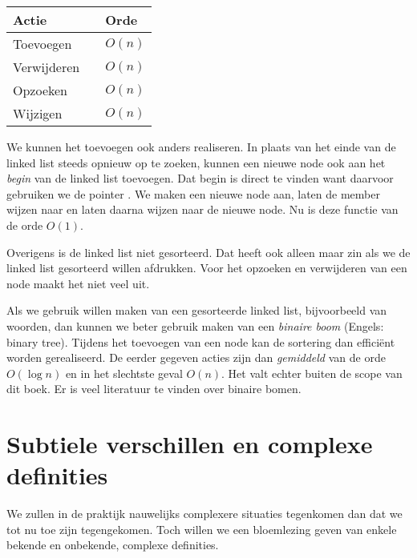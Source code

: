 \begin{table}[!ht]
\begin{tabular}{lp{1em}l}
Actie && Orde \\
\midrule
Toevoegen && $O(n)$ \\
Verwijderen && $O(n)$ \\
Opzoeken && $O(n)$ \\
Wijzigen && $O(n)$
\end{tabular}
\end{table}
\basic

We kunnen het toevoegen ook anders realiseren. In plaats van het einde van de linked list steeds opnieuw op te zoeken, kunnen een nieuwe node ook aan het \textsl{begin} van de linked list toevoegen. Dat begin is direct te vinden want daarvoor gebruiken we de pointer . We maken een nieuwe node aan, laten de member  wijzen naar  en laten daarna  wijzen naar de nieuwe node. Nu is deze functie van de orde $O(1)$.

Overigens is de linked list niet gesorteerd. Dat heeft ook alleen maar zin als we de linked list gesorteerd willen afdrukken. Voor het opzoeken en verwijderen van een node maakt het niet veel uit.

Als we gebruik willen maken van een gesorteerde linked list, bijvoorbeeld van woorden, dan kunnen we beter gebruik maken van een \textsl{binaire boom} (Engels: binary tree). Tijdens het toevoegen van een node kan de sortering dan efficiënt worden gerealiseerd. De eerder gegeven acties zijn dan \textsl{gemiddeld} van de orde $O(\log n)$ en in het slechtste geval $O(n)$. Het valt echter buiten de scope van dit boek. Er is veel literatuur te vinden over binaire bomen. 

\section{Subtiele verschillen en complexe definities}
We zullen in de praktijk nauwelijks complexere situaties tegenkomen dan dat we tot nu toe zijn tegengekomen. Toch willen we een bloemlezing geven van enkele bekende en onbekende, complexe definities.

